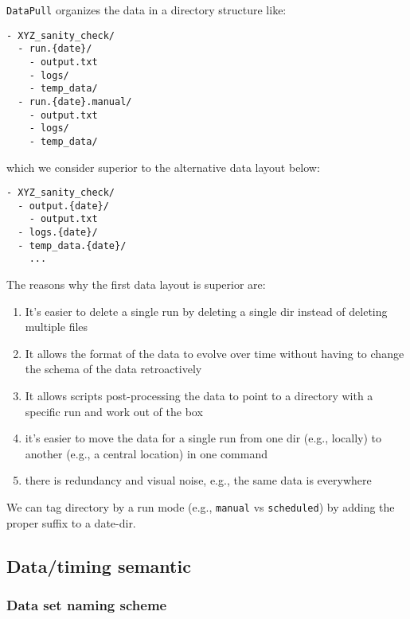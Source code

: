\documentclass[11pt, reqno]{amsart}
\theoremstyle{definition}
\theoremstyle{remark}
\begin{document}
\verb|DataPull| organizes the data in a directory structure like:

\begin{verbatim}
- XYZ_sanity_check/
  - run.{date}/
    - output.txt
    - logs/
    - temp_data/
  - run.{date}.manual/
    - output.txt
    - logs/
    - temp_data/
\end{verbatim}

which we consider superior to the alternative data layout below:

\begin{verbatim}
- XYZ_sanity_check/
  - output.{date}/
    - output.txt
  - logs.{date}/
  - temp_data.{date}/
    ...
\end{verbatim}

The reasons why the first data layout is superior are:

\begin{enumerate}
  \item It's easier to delete a single run by deleting a single dir instead of
        deleting multiple files
  \item It allows the format of the data to evolve over time without having to
        change the schema of the data retroactively
  \item It allows scripts post-processing the data to point to a directory
        with a specific run and work out of the box
  \item it's easier to move the data for a single run from one dir (e.g.,
        locally) to another (e.g., a central location) in one command
  \item there is redundancy and visual noise, e.g., the same data is
        everywhere
\end{enumerate}

We can tag directory by a run mode (e.g., \verb|manual| vs \verb|scheduled|) by
adding the proper suffix to a date-dir.

\subsection{Data/timing semantic}

\subsubsection{Data set naming scheme}\label{data-set-naming-scheme}
\end{document}
